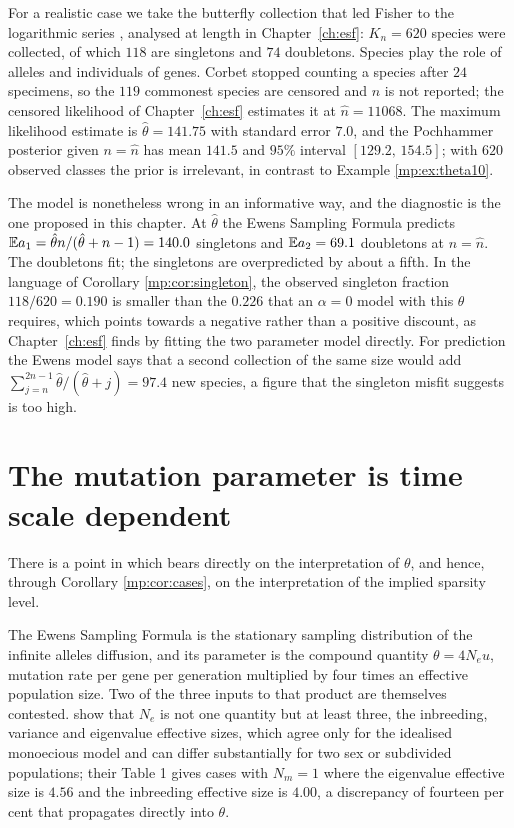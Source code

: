 \begin{example}
\label{mp:ex:corbet}
For a realistic case we take the butterfly collection that led Fisher to the logarithmic
series \citep{mp:fisher1943}, analysed at length in Chapter~\ref{ch:esf}: $K_n=620$
species were collected, of which $118$ are singletons and $74$ doubletons. Species play the
role of alleles and individuals of genes. Corbet stopped counting a species after $24$
specimens, so the $119$ commonest species are censored and $n$ is not reported; the
censored likelihood of Chapter~\ref{ch:esf} estimates it at $\hat n=11068$. The maximum
likelihood estimate is $\hat\theta=141.75$ with standard error $7.0$, and the Pochhammer
posterior given $n=\hat n$ has mean $141.5$ and $95\%$ interval $[129.2,\,154.5]$; with $620$
observed classes the prior is irrelevant, in contrast to Example \ref{mp:ex:theta10}.

The model is nonetheless wrong in an informative way, and the diagnostic is the one
proposed in this chapter. At $\hat\theta$ the Ewens Sampling Formula predicts
$\mathbb{E} a_1=\hat\theta n/(\hat\theta+n-1)=140.0$ singletons and $\mathbb{E} a_2=69.1$ doubletons at
$n=\hat n$. The doubletons fit; the singletons are overpredicted by about a fifth. In the
language of Corollary \ref{mp:cor:singleton}, the observed singleton fraction $118/620=0.190$
is smaller than the $0.226$ that an $\alpha=0$ model with this $\theta$ requires, which points towards a
negative rather than a positive discount, as Chapter~\ref{ch:esf} finds by fitting the two
parameter model directly. For prediction the Ewens model says that a second collection of
the same size would add $\sum_{j=n}^{2n-1}\hat\theta/(\hat\theta+j)=97.4$ new species, a
figure that the singleton misfit suggests is too high.
\end{example}

\section{The mutation parameter is time scale dependent}
\label{mp:sec:timescale}

There is a point in \citet{mp:hossjer2025} which bears directly on the interpretation of
$\theta$, and hence, through Corollary \ref{mp:cor:cases}, on the interpretation of the implied
sparsity level.

The Ewens Sampling Formula is the stationary sampling distribution of the infinite alleles
diffusion, and its parameter is the compound quantity $\theta=4N_eu$, mutation rate per gene
per generation multiplied by four times an effective population size. Two of the three
inputs to that product are themselves contested. \citet{mp:ewenshossjer2025} show that
$N_e$ is not one quantity but at least three, the inbreeding, variance and eigenvalue
effective sizes, which agree only for the idealised monoecious model and can differ
substantially for two sex or subdivided populations; their Table 1 gives cases with
$N_m=1$ where the eigenvalue effective size is $4.56$ and the inbreeding effective size is
$4.00$, a discrepancy of fourteen per cent that propagates directly into $\theta$.

